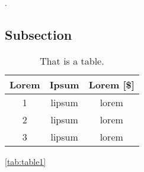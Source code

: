 
\lipsum[2-4] \cite{benny_history}. 

\subsection{Subsection}
\lipsum[5]



\begin{table}[H]
    \centering
    \caption{That is a table.}
    \begin{tabular}{|c|c|c|}
    \centering
    \textbf{Lorem} & \textbf{Ipsum} & \textbf{Lorem [\$]} \\ \hline \hline
1   & lipsum    & lorem     \\ \hline   
2   & lipsum    & lorem   \\ \hline
3   & lipsum    & lorem  
    \end{tabular}
    \label{tab:table1}
\end{table}

\lipsum[8]
\autoref{tab:table1}
